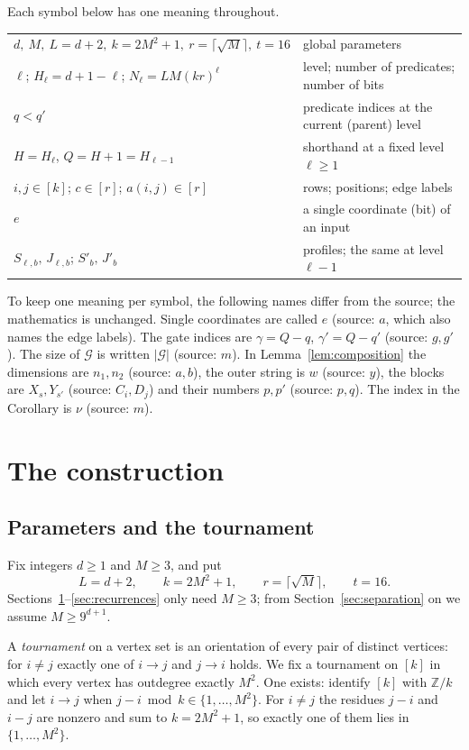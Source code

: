 \documentclass[11pt]{article}
\theoremstyle{definition}
\theoremstyle{remark}
\begin{document}
Each symbol below has one meaning throughout.
\begin{center}
\begin{tabular}{ll}
\(d,\ M,\ L=d+2,\ k=2M^2+1,\ r=\lceil\sqrt M\rceil,\ t=16\) & global parameters\\
\(\ell\); \(H_\ell=d+1-\ell\); \(N_\ell=LM(kr)^\ell\) & level; number of predicates; number of bits\\
\(q<q'\) & predicate indices at the current (parent) level\\
\(H=H_\ell\), \(Q=H+1=H_{\ell-1}\) & shorthand at a fixed level \(\ell\ge1\)\\
\(i,j\in[k]\); \(c\in[r]\); \(a(i,j)\in[r]\) & rows; positions; edge labels\\
\(e\) & a single coordinate (bit) of an input\\
\(S_{\ell,b},\,J_{\ell,b}\); \(S'_b,\,J'_b\) & profiles; the same at level \(\ell-1\)\\
\end{tabular}
\end{center}
To keep one meaning per symbol, the following names differ from the source;
the mathematics is unchanged. Single coordinates are called \(e\) (source:
\(a\), which also names the edge labels). The gate indices are
\(\gamma=Q-q\), \(\gamma'=Q-q'\) (source: \(g,g'\)). The size of
\(\mathcal G\) is written \(|\mathcal G|\) (source: \(m\)). In
Lemma~\ref{lem:composition} the dimensions are \(n_1,n_2\) (source: \(a,b\)),
the outer string is \(w\) (source: \(y\)), the blocks are
\(X_s,Y_{s'}\) (source: \(C_i,D_j\)) and their numbers \(p,p'\) (source:
\(p,q\)). The index in the Corollary is \(\nu\) (source: \(m\)).

\section{The construction}
\label{sec:construction}

\subsection{Parameters and the tournament}

Fix integers \(d\ge1\) and \(M\ge3\), and put
\[
 L=d+2,\qquad k=2M^2+1,\qquad r=\lceil\sqrt M\rceil,
 \qquad t=16.
\]
Sections~\ref{sec:construction}--\ref{sec:recurrences} only need \(M\ge3\);
from Section~\ref{sec:separation} on we assume \(M\ge 9^{d+1}\).

A \emph{tournament} on a vertex set is an orientation of every pair of
distinct vertices: for \(i\ne j\) exactly one of \(i\to j\) and \(j\to i\)
holds. We fix a tournament on \([k]\) in which every vertex has outdegree
exactly \(M^2\). One exists: identify \([k]\) with \(\mathbb Z/k\) and let
\(i\to j\) when \(j-i \bmod k\in\{1,\ldots,M^2\}\). For \(i\ne j\) the residues
\(j-i\) and \(i-j\) are nonzero and sum to \(k=2M^2+1\), so exactly one of them
lies in \(\{1,\ldots,M^2\}\).
\end{document}
